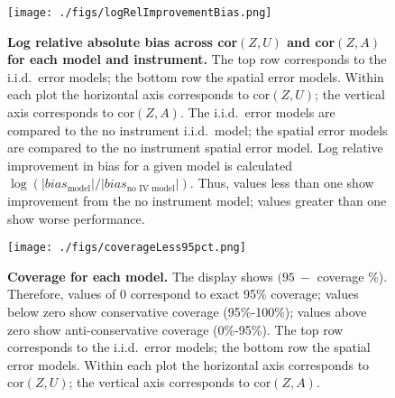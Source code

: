 \documentclass[12pt]{article}
\begin{document}
\begin{figure}[h]
    \centering
    \texttt{[image: ./figs/logRelImprovementBias.png]}
    \caption{\textbf{Log relative absolute bias across cor$(Z,U)$ and cor$(Z,A)$ for each model and instrument.} The top row corresponds to the i.i.d.~error models; the bottom row the spatial error models. Within each plot the horizontal axis corresponds to cor$(Z,U)$; the vertical axis corresponds to cor$(Z,A)$. The i.i.d.~error models are compared to the no instrument i.i.d.~model; the spatial error models are compared to the no instrument spatial error model.  Log relative improvement in bias for a given model is calculated $\log ( |bias_{\text{model}}| / |bias_{\text{no~IV~model}}| )$.  Thus, values less than one show improvement from the no instrument model; values greater than one show worse performance.}
    \label{fig:logRelAbsBias}
\end{figure}

\begin{figure}[h]
    \centering
    \texttt{[image: ./figs/coverageLess95pct.png]}
    \caption{\textbf{Coverage for each model.} The display shows $(95~- $ coverage \%). Therefore, values of 0 correspond to exact 95\% coverage; values below zero show conservative coverage (95\%-100\%); values above zero show anti-conservative coverage (0\%-95\%). The top row corresponds to the i.i.d.~error models; the bottom row the spatial error models. Within each plot the horizontal axis corresponds to cor$(Z,U)$; the vertical axis corresponds to cor$(Z,A)$. }
    \label{fig:coverageLess95}
\end{figure}
\end{document}
